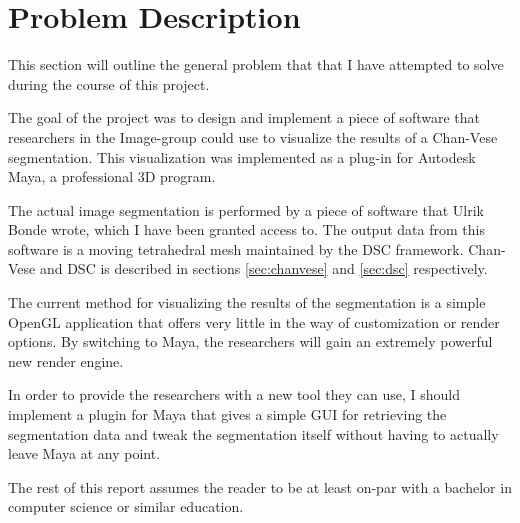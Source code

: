 \section{Problem Description}
This section will outline the general problem that that I have attempted to
solve during the course of this project.

The goal of the project was to design and implement a piece of software that researchers in
the Image-group could use to visualize the results of a Chan-Vese segmentation.
This visualization was implemented as a plug-in for Autodesk Maya, a
professional 3D program.

The actual image segmentation is performed by a piece of software that Ulrik
Bonde wrote, which I have been granted access to. The output data from this
software is a moving tetrahedral mesh maintained by the DSC framework.
Chan-Vese and DSC is described in sections \ref{sec:chanvese} and \ref{sec:dsc}
respectively.

The current method for visualizing the results of the segmentation is a
simple OpenGL application that offers very little in the way of customization
or render options. By switching to Maya, the researchers will gain an extremely
powerful new render engine.

In order to provide the researchers with a new tool they can use, I should
implement a plugin for Maya that gives a simple GUI for retrieving the
segmentation data and tweak the segmentation itself without having to actually
leave Maya at any point.

The rest of this report assumes the reader to be at least on-par with a
bachelor in computer science or similar education.